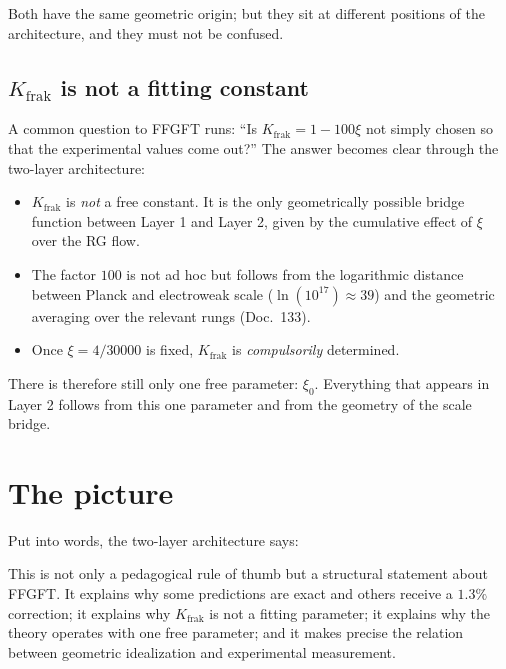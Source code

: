 Both have the same geometric origin; but they sit at different
positions of the architecture, and they must not be confused.

\subsection{$K_{\mathrm{frak}}$ is not a fitting constant}

A common question to FFGFT runs: ``Is $K_{\mathrm{frak}} = 1 - 100\xi$
not simply chosen so that the experimental values come out?'' The
answer becomes clear through the two-layer architecture:

\begin{itemize}\setlength\itemsep{0pt}
  \item $K_{\mathrm{frak}}$ is \emph{not} a free constant. It is the
        only geometrically possible bridge function between Layer 1
        and Layer 2, given by the cumulative effect of $\xi$ over
        the RG flow.
  \item The factor $100$ is not ad hoc but follows from the
        logarithmic distance between Planck and electroweak scale
        ($\ln(10^{17}) \approx 39$) and the geometric averaging over
        the relevant rungs (Doc.~133).
  \item Once $\xi = 4/30000$ is fixed, $K_{\mathrm{frak}}$ is
        \emph{compulsorily} determined.
\end{itemize}

There is therefore still only one free parameter: $\xi_{0}$.
Everything that appears in Layer 2 follows from this one parameter
and from the geometry of the scale bridge.

\section{The picture}

Put into words, the two-layer architecture says:

\begin{center}
\end{center}

This is not only a pedagogical rule of thumb but a structural statement
about FFGFT. It explains why some predictions are exact and others
receive a $1{.}3\%$ correction; it explains why $K_{\mathrm{frak}}$ is
not a fitting parameter; it explains why the theory operates with one
free parameter; and it makes precise the relation between geometric
idealization and experimental measurement.


